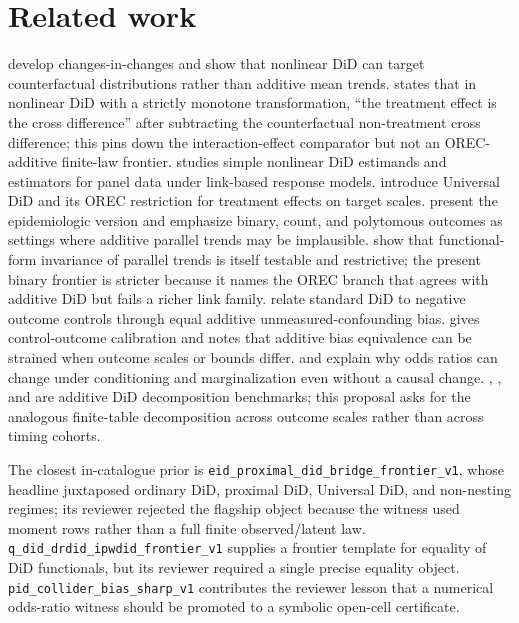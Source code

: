 \documentclass[11pt]{article}
\theoremstyle{definition}
\theoremstyle{plain}
\theoremstyle{remark}
\begin{document}
\section{Related work}
\citet[Sec. 3]{AtheyImbens2006} develop changes-in-changes and show that nonlinear DiD can target counterfactual distributions rather than additive mean trends.  \citet[p. 85, Abstract]{Puhani2012} states that in nonlinear DiD with a strictly monotone transformation, ``the treatment effect is the cross difference'' after subtracting the counterfactual non-treatment cross difference; this pins down the interaction-effect comparator but not an OREC-additive finite-law frontier.  \citet[Sec. 2]{Wooldridge2023} studies simple nonlinear DiD estimands and estimators for panel data under link-based response models.  \citet[Abstract and Sec. 2]{ParkTchetgenTchetgen2022} introduce Universal DiD and its OREC restriction for treatment effects on target scales.  \citet[Abstract and Sec. 2]{TchetgenTchetgenParkRichardson2024} present the epidemiologic version and emphasize binary, count, and polytomous outcomes as settings where additive parallel trends may be implausible.  \citet[Theorem 1 and Sec. 3]{RothSantAnna2023} show that functional-form invariance of parallel trends is itself testable and restrictive; the present binary frontier is stricter because it names the OREC branch that agrees with additive DiD but fails a richer link family.  \citet{SoferRichardsonColicinoSchwartzTchetgen2016} relate standard DiD to negative outcome controls through equal additive unmeasured-confounding bias.  \citet{TchetgenTchetgen2014} gives control-outcome calibration and notes that additive bias equivalence can be strained when outcome scales or bounds differ.  \citet{Mood2010} and \citet{PangKaufmanPlatt2016} explain why odds ratios can change under conditioning and marginalization even without a causal change.  \citet{GoodmanBacon2021}, \citet{DeChaisemartinDHaultfoeuille2020}, and \citet{SunAbraham2021} are additive DiD decomposition benchmarks; this proposal asks for the analogous finite-table decomposition across outcome scales rather than across timing cohorts.

The closest in-catalogue prior is \texttt{eid\_proximal\_did\_bridge\_frontier\_v1}, whose headline juxtaposed ordinary DiD, proximal DiD, Universal DiD, and non-nesting regimes; its reviewer rejected the flagship object because the witness used moment rows rather than a full finite observed/latent law.  \texttt{q\_did\_drdid\_ipwdid\_frontier\_v1} supplies a frontier template for equality of DiD functionals, but its reviewer required a single precise equality object.  \texttt{pid\_collider\_bias\_sharp\_v1} contributes the reviewer lesson that a numerical odds-ratio witness should be promoted to a symbolic open-cell certificate.
\end{document}
